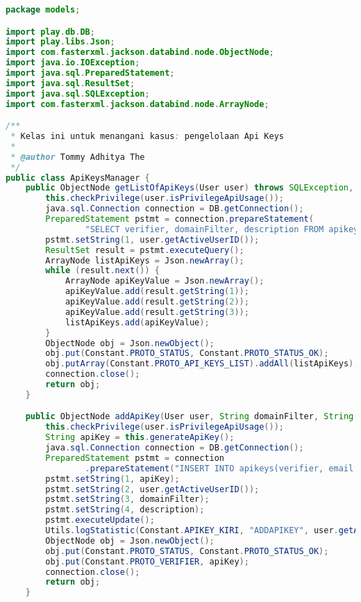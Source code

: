 \begin{lstlisting}[language=Java,basicstyle=\tiny,caption=models/ApiKeysManager.java,label={lst:ApiKeysManager.java}]
package models;

import play.db.DB;
import play.libs.Json;
import com.fasterxml.jackson.databind.node.ObjectNode;
import java.io.IOException;
import java.sql.PreparedStatement;
import java.sql.ResultSet;
import java.sql.SQLException;
import com.fasterxml.jackson.databind.node.ArrayNode;

/**
 * Kelas ini untuk menangani kasus: pengelolaan Api Keys
 * 
 * @author Tommy Adhitya The
 */
public class ApiKeysManager {
	public ObjectNode getListOfApiKeys(User user) throws SQLException, IOException {
		this.checkPrivilege(user.isPrivilegeApiUsage());
		java.sql.Connection connection = DB.getConnection();
		PreparedStatement pstmt = connection.prepareStatement(
				"SELECT verifier, domainFilter, description FROM apikeys WHERE email=? ORDER BY verifier");
		pstmt.setString(1, user.getActiveUserID());
		ResultSet result = pstmt.executeQuery();
		ArrayNode listApiKeys = Json.newArray();
		while (result.next()) {
			ArrayNode apiKeyValue = Json.newArray();
			apiKeyValue.add(result.getString(1));
			apiKeyValue.add(result.getString(2));
			apiKeyValue.add(result.getString(3));
			listApiKeys.add(apiKeyValue);
		}
		ObjectNode obj = Json.newObject();
		obj.put(Constant.PROTO_STATUS, Constant.PROTO_STATUS_OK);
		obj.putArray(Constant.PROTO_API_KEYS_LIST).addAll(listApiKeys);
		connection.close();
		return obj;
	}

	public ObjectNode addApiKey(User user, String domainFilter, String description) throws SQLException, IOException {
		this.checkPrivilege(user.isPrivilegeApiUsage());
		String apiKey = this.generateApiKey();
		java.sql.Connection connection = DB.getConnection();
		PreparedStatement pstmt = connection
				.prepareStatement("INSERT INTO apikeys(verifier, email, domainFilter, description) VALUES(?,?,?,?)");
		pstmt.setString(1, apiKey);
		pstmt.setString(2, user.getActiveUserID());
		pstmt.setString(3, domainFilter);
		pstmt.setString(4, description);
		pstmt.executeUpdate();
		Utils.logStatistic(Constant.APIKEY_KIRI, "ADDAPIKEY", user.getActiveUserID() + apiKey);
		ObjectNode obj = Json.newObject();
		obj.put(Constant.PROTO_STATUS, Constant.PROTO_STATUS_OK);
		obj.put(Constant.PROTO_VERIFIER, apiKey);
		connection.close();
		return obj;
	}


\end{lstlisting}
